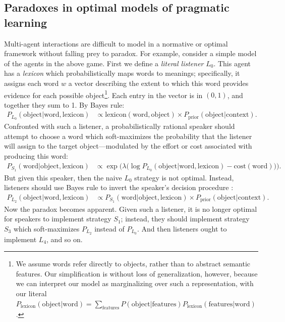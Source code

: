 \documentclass{article} %
\newcommand{\word}{\text{word}}
\newcommand{\obj}{\text{object}}
\newcommand{\lex}{\text{lexicon}}
\newcommand{\prior}{P_{\text{prior}}(\obj | \text{context})}
\begin{document}
\subsection{Paradoxes in optimal models of pragmatic learning}
Multi-agent interactions are difficult to model in a normative or
optimal framework without falling prey to paradox. For example,
consider a simple model of the agents in the above game. First we
define a \textit{literal listener} $L_0$. This agent has a
\textit{lexicon} which probabilistically maps words to meanings;
specifically, it assigns each word $w$ a vector describing the extent
to which this word provides evidence for each possible object\footnote{We
  assume words refer directly to objects, rather than to abstract
  semantic features. Our simplification is without loss of
  generalization, however, because we can interpret our model as
  marginalizing over such a representation, with our literal
  $P_\lex(\obj | \word) = \sum_\text{features} P(\obj |
  \text{features}) P_\lex(\text{features} | \word)$.}. Each entry in
the vector is in $(0, 1)$, and together they sum to 1. By Bayes rule:
\begin{align*}
P_{L_0}(\obj | \word, \lex) &\propto \lex(\word, \obj) \times \prior.
\end{align*}
Confronted with such a listener, a probabilistically rational speaker
should attempt to choose a word which soft-maximizes the probability
that the listener will assign to the target object---modulated by the
effort or cost associated with producing this word:
\begin{align*}
P_{S_1}(\word | \obj, \lex) &\propto \exp\Big(\lambda \big(\log P_{L_0}(\obj | \word, \lex) - \text{cost}(\word)\big)\Big).
\end{align*}
But given this speaker, then the naive $L_0$ strategy is not
optimal. Instead, listeners should use Bayes rule to invert the
speaker's decision procedure \cite{frank2012}:
\begin{align*}
P_{L_2}(\obj | \word, \lex) &\propto P_{S_1}(\word | \obj, \lex) \times \prior.
\end{align*}
Now the paradox becomes apparent. Given such a listener, it is no
longer optimal for speakers to implement strategy $S_1$; instead, they
should implement strategy $S_3$ which soft-maximizes $P_{L_2}$ instead
of $P_{L_0}$. And then listeners ought to implement $L_4$, and so on.
\end{document}
